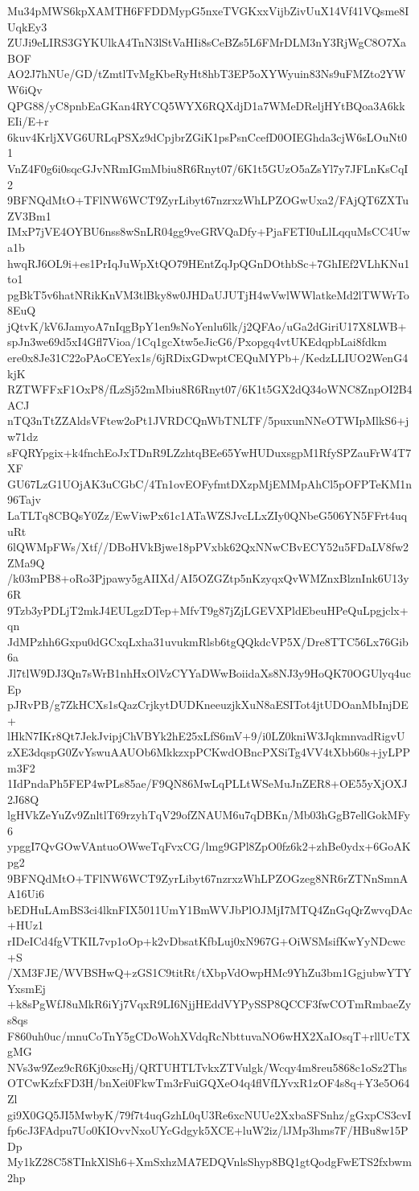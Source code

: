 Mu34pMWS6kpXAMTH6FFDDMypG5nxeTVGKxxVijbZivUuX14Vf41VQsme8IUqkEy3
ZUJi9eLIRS3GYKUlkA4TnN3lStVaHIi8sCeBZs5L6FMrDLM3nY3RjWgC8O7XaBOF
AO2J7hNUe/GD/tZmtlTvMgKbeRyHt8hbT3EP5oXYWyuin83Ns9uFMZto2YWW6iQv
QPG88/yC8pnbEaGKan4RYCQ5WYX6RQXdjD1a7WMeDReljHYtBQoa3A6kkEIi/E+r
6kuv4KrljXVG6URLqPSXz9dCpjbrZGiK1psPsnCcefD0OIEGhda3cjW6sLOuNt01
VnZ4F0g6i0sqcGJvNRmIGmMbiu8R6Rnyt07/6K1t5GUzO5aZsYl7y7JFLnKsCqI2
9BFNQdMtO+TFlNW6WCT9ZyrLibyt67nzrxzWhLPZOGwUxa2/FAjQT6ZXTuZV3Bm1
IMxP7jVE4OYBU6nss8wSnLR04gg9veGRVQaDfy+PjaFETI0uLlLqquMsCC4Uwa1b
hwqRJ6OL9i+es1PrIqJuWpXtQO79HEntZqJpQGnDOthbSc+7GhIEf2VLhKNu1to1
pgBkT5v6hatNRikKnVM3tlBky8w0JHDaUJUTjH4wVwlWWlatkeMd2lTWWrTo8EuQ
jQtvK/kV6JamyoA7nIqgBpY1en9sNoYenlu6lk/j2QFAo/uGa2dGiriU17X8LWB+
spJn3we69d5xI4Gfl7Vioa/1Cq1gcXtw5eJicG6/Pxopgq4vtUKEdqpbLai8fdkm
ere0x8Je31C22oPAoCEYex1s/6jRDixGDwptCEQuMYPb+/KedzLLIUO2WenG4kjK
RZTWFFxF1OxP8/fLzSj52mMbiu8R6Rnyt07/6K1t5GX2dQ34oWNC8ZnpOI2B4ACJ
nTQ3nTtZZAldsVFtew2oPt1JVRDCQnWbTNLTF/5puxunNNeOTWIpMlkS6+jw71dz
sFQRYpgix+k4fnchEoJxTDnR9LZzhtqBEe65YwHUDuxsgpM1RfySPZauFrW4T7XF
GU67LzG1UOjAK3uCGbC/4Tn1ovEOFyfmtDXzpMjEMMpAhCl5pOFPTeKM1n96Tajv
LaTLTq8CBQsY0Zz/EwViwPx61c1ATaWZSJvcLLxZIy0QNbeG506YN5FFrt4uquRt
6lQWMpFWs/Xtf//DBoHVkBjwe18pPVxbk62QxNNwCBvECY52u5FDaLV8fw2ZMa9Q
/k03mPB8+oRo3Pjpawy5gAIIXd/AI5OZGZtp5nKzyqxQvWMZnxBlznInk6U13y6R
9Tzb3yPDLjT2mkJ4EULgzDTep+MfvT9g87jZjLGEVXPldEbeuHPeQuLpgjclx+qn
JdMPzhh6Gxpu0dGCxqLxha31uvukmRlsb6tgQQkdcVP5X/Dre8TTC56Lx76Gib6a
Jl7tlW9DJ3Qn7sWrB1nhHxOlVzCYYaDWwBoiidaXs8NJ3y9HoQK70OGUlyq4ucEp
pJRvPB/g7ZkHCXs1sQazCrjkytDUDKneeuzjkXuN8aESITot4jtUDOanMbInjDE+
lHkN7IKr8Qt7JekJvipjChVBYk2hE25xLfS6mV+9/i0LZ0kniW3JqkmnvadRigvU
zXE3dqspG0ZvYswuAAUOb6MkkzxpPCKwdOBncPXSiTg4VV4tXbb60s+jyLPPm3F2
1IdPndaPh5FEP4wPLs85ae/F9QN86MwLqPLLtWSeMuJnZER8+OE55yXjOXJ2J68Q
lgHVkZeYuZv9ZnltlT69rzyhTqV29ofZNAUM6u7qDBKn/Mb03hGgB7ellGokMFy6
ypggI7QvGOwVAntuoOWweTqFvxCG/lmg9GPl8ZpO0fz6k2+zhBe0ydx+6GoAKpg2
9BFNQdMtO+TFlNW6WCT9ZyrLibyt67nzrxzWhLPZOGzeg8NR6rZTNnSmnAA16Ui6
bEDHuLAmBS3ci4lknFIX5011UmY1BmWVJbPlOJMjI7MTQ4ZnGqQrZwvqDAc+HUz1
rIDeICd4fgVTKIL7vp1oOp+k2vDbsatKfbLuj0xN967G+OiWSMsifKwYyNDcwc+S
/XM3FJE/WVBSHwQ+zGS1C9titRt/tXbpVdOwpHMc9YhZu3bm1GgjubwYTYYxsmEj
+k8sPgWfJ8uMkR6iYj7VqxR9LI6NjjHEddVYPySSP8QCCF3fwCOTmRmbaeZys8qs
F860uh0uc/mnuCoTnY5gCDoWohXVdqRcNbttuvaNO6wHX2XaIOsqT+rllUcTXgMG
NVs3w9Zez9cR6Kj0xscHj/QRTUHTLTvkxZTVulgk/Wcqy4m8reu5868c1oSz2Ths
OTCwKzfxFD3H/bnXei0FkwTm3rFuiGQXeO4q4flVfLYvxR1zOF4s8q+Y3e5O64Zl
gi9X0GQ5JI5MwbyK/79f7t4uqGzhL0qU3Re6xcNUUe2XxbaSFSnhz/gGxpCS3cvI
fp6cJ3FAdpu7Uo0KIOvvNxoUYcGdgyk5XCE+luW2iz/lJMp3hms7F/HBu8w15PDp
My1kZ28C58TInkXlSh6+XmSxhzMA7EDQVnlsShyp8BQ1gtQodgFwETS2fxbwm2hp
